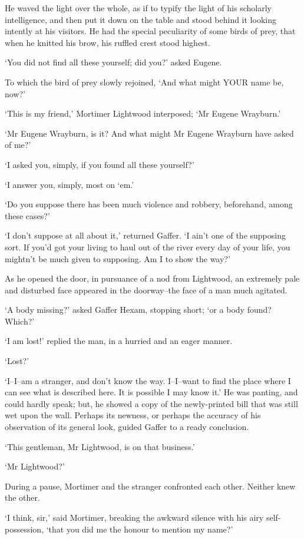 He waved the light over the whole, as if to typify the light of his
scholarly intelligence, and then put it down on the table and stood
behind it looking intently at his visitors. He had the special
peculiarity of some birds of prey, that when he knitted his brow, his
ruffled crest stood highest.

‘You did not find all these yourself; did you?’ asked Eugene.

To which the bird of prey slowly rejoined, ‘And what might YOUR name be,
now?’

‘This is my friend,’ Mortimer Lightwood interposed; ‘Mr Eugene
Wrayburn.’

‘Mr Eugene Wrayburn, is it? And what might Mr Eugene Wrayburn have asked
of me?’

‘I asked you, simply, if you found all these yourself?’

‘I answer you, simply, most on ‘em.’

‘Do you suppose there has been much violence and robbery, beforehand,
among these cases?’

‘I don’t suppose at all about it,’ returned Gaffer. ‘I ain’t one of the
supposing sort. If you’d got your living to haul out of the river every
day of your life, you mightn’t be much given to supposing. Am I to show
the way?’

As he opened the door, in pursuance of a nod from Lightwood, an
extremely pale and disturbed face appeared in the doorway--the face of a
man much agitated.

‘A body missing?’ asked Gaffer Hexam, stopping short; ‘or a body found?
Which?’

‘I am lost!’ replied the man, in a hurried and an eager manner.

‘Lost?’

‘I--I--am a stranger, and don’t know the way. I--I--want to find the
place where I can see what is described here. It is possible I may know
it.’ He was panting, and could hardly speak; but, he showed a copy of
the newly-printed bill that was still wet upon the wall. Perhaps its
newness, or perhaps the accuracy of his observation of its general look,
guided Gaffer to a ready conclusion.

‘This gentleman, Mr Lightwood, is on that business.’

‘Mr Lightwood?’

During a pause, Mortimer and the stranger confronted each other. Neither
knew the other.

‘I think, sir,’ said Mortimer, breaking the awkward silence with his
airy self-possession, ‘that you did me the honour to mention my name?’

